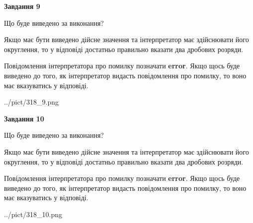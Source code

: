 \documentclass[12pt, ukrainian]{article}
\begin{document}
{\begin {Large}
{\begin {center}\textbf{Завдання 9}\end {center}}\par
Що буде виведено за виконання? \par

Якщо має бути виведено дійсне значення та інтерпретатор має здійснювати його округлення, 
то у відповіді достатньо правильно вказати два дробових розряди.

Повідомлення інтерпретатора про помилку позначати \textbf{error}.
Якщо щось буде виведено до того, як інтерпретатор видасть повідомлення про помилку, 
то воно має вказуватись у відповіді. \par

\begin{center}
	{../pict/318_9.png}
\end{center}
\newpage

{\begin {center}\textbf{Завдання 10}\end {center}}\par
Що буде виведено за виконання? \par

Якщо має бути виведено дійсне значення та інтерпретатор має здійснювати його округлення, 
то у відповіді достатньо правильно вказати два дробових розряди.

Повідомлення інтерпретатора про помилку позначати \textbf{error}.
Якщо щось буде виведено до того, як інтерпретатор видасть повідомлення про помилку, 
то воно має вказуватись у відповіді. \par

\begin{center}
	{../pict/318_10.png}
\end{center}
\newpage

\end {Large}}
\end{document}
